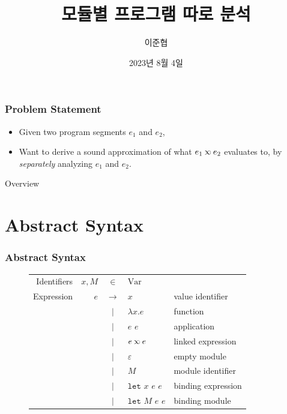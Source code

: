 \documentclass{beamer}
\title{모듈별 프로그램 따로 분석}
\author{이준협}
\date{2023년 8월 4일}
\institute{ROPAS Show \& Tell}
\newcommand*{\vbar}{|}
\newcommand*{\ExprVar}{\text{Var}}
\newcommand*{\semlink}{\mathbin{\rotatebox[origin=c]{180}{$\propto$}}}
\newcommand*{\link}[2]{{#1}\semlink{#2}}
\newcommand*{\Let}{\mathtt{let}}
\begin{document}
\maketitle
\begin{frame}[c]
  \frametitle{Problem Statement}
  \begin{itemize}
    \item Given two program segments $e_1$ and $e_2$,
    \item Want to derive a sound approximation of what ${\link{e_1}{e_2}}$ evaluates to, by \emph{separately} analyzing $e_1$ and $e_2$.
  \end{itemize}
\end{frame}
\begin{frame}{Overview}
  \tableofcontents
\end{frame}
\section{Abstract Syntax}
\begin{frame}[c]
  \frametitle{Abstract Syntax}
  \begin{figure}[h!]
    \centering
    \begin{tabular}{rrcll}
      Identifiers & $x,M$ & $\in$         & $\ExprVar$                              \\
      Expression  & $e$   & $\rightarrow$ & $x$                & value identifier   \\
                  &       & $\vbar$       & $\lambda x.e$      & function           \\
                  &       & $\vbar$       & $e$ $e$            & application        \\
                  &       & $\vbar$       & $\link{e}{e}$      & linked expression  \\
                  &       & $\vbar$       & $\varepsilon$      & empty module       \\
                  &       & $\vbar$       & $M$                & module identifier  \\
                  &       & $\vbar$       & $\Let$ $x$ $e$ $e$ & binding expression \\
                  &       & $\vbar$       & $\Let$ $M$ $e$ $e$ & binding module     \\
    \end{tabular}
  \end{figure}
\end{frame}
\end{document}
